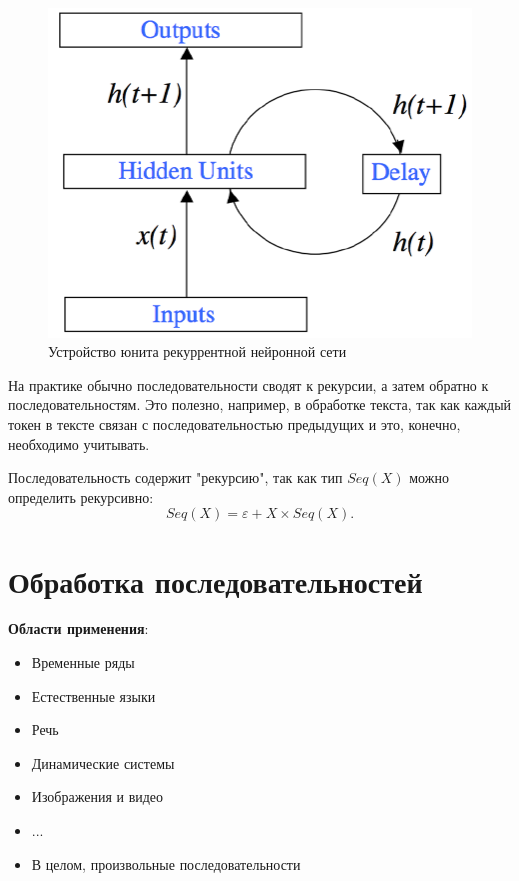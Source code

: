 \begin{figure}[htb]
    \centering
    \includegraphics[scale=0.3]{images/rnn-unit.png}
    \caption{Устройство юнита рекуррентной нейронной сети}
\end{figure}

На практике обычно последовательности сводят к рекурсии, а затем обратно к последовательностям. Это полезно, например, в обработке текста, так как каждый токен в тексте связан с последовательностью предыдущих и это, конечно, необходимо учитывать. 

\begin{remark}
    Последовательность содержит "рекурсию", так как тип $Seq(X)$ можно определить рекурсивно:
    \[
        Seq(X)=\varepsilon+X\times Seq(X).
    \]
\end{remark}

\section{Обработка последовательностей}

\textbf{Области применения}:
\begin{itemize}
    \item Временные ряды
    \item Естественные языки
    \item Речь
    \item Динамические системы
    \item Изображения и видео
    \item ... 
    \item В целом, произвольные последовательности
\end{itemize}

